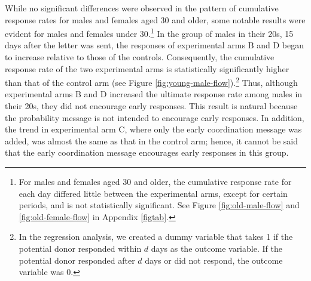 \documentclass [12pt, a4paper]{article}
\begin{document}
While no significant differences were observed in the pattern of cumulative response rates for males and females aged 30 and older, some notable results were evident for males and females under 30.\footnote{For males and females aged 30 and older, the cumulative response rate for each day differed little between the experimental arms, except for certain periods, and is not statistically significant. See Figure \ref{fig:old-male-flow} and \ref{fig:old-female-flow} in Appendix \ref{figtab}.} In the group of males in their 20s, 15 days after the letter was sent, the responses of experimental arms B and D began to increase relative to those of the controls. Consequently, the cumulative response rate of the two experimental arms is statistically significantly higher than that of the control arm (see Figure \ref{fig:young-male-flow}).\footnote{In the regression analysis, we created a dummy variable that takes 1 if the potential donor responded within \(d\) days as the outcome variable. If the potential donor responded after \(d\) days or did not respond, the outcome variable was 0.} Thus, although experimental arms B and D increased the ultimate response rate among males in their 20s, they did not encourage early responses. This result is natural because the probability message is not intended to encourage early responses. In addition, the trend in experimental arm C, where only the early coordination message was added, was almost the same as that in the control arm; hence, it cannot be said that the early coordination message encourages early responses in this group.
\end{document}
